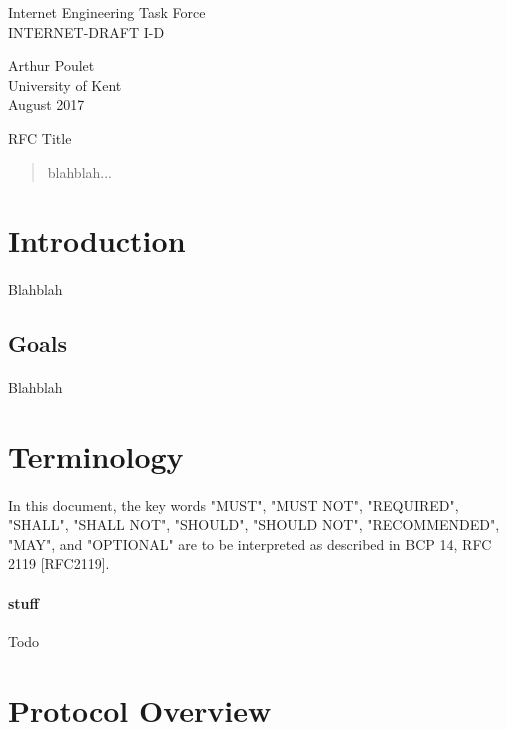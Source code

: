 \documentclass[10pt]{article}
\newcommand{\rfcId}{I-D}
\newcommand{\rfcTitle}{RFC Title}
\newcommand{\rfcAuthor}{Arthur Poulet}
\newcommand{\rfcDate}{August 2017}
\newcommand{\rfcInstitution}{University of Kent}
\newcommand{\rfcSection}[2]{
	\rfcNewPage
	\vspace*{0.1in}
	\section{#1}
	{\narrower #2 \par}
	\vfill
}
\newcommand{\rfcSubsection}[2]{
\vspace*{0.1in}
\subsection{#1}
\vspace*{0.15in}
{\narrower #2 \par}
}
\newcommand{\rfcNewPage}{\hspace{6in}\newpage}
\begin{document}
\begin{multicols}{2}
	\begin{flushleft}
		Internet Engineering Task Force \\
		INTERNET-DRAFT \rfcId
	\end{flushleft}
\columnbreak
	\begin{flushright}
		\rfcAuthor \\
		\rfcInstitution \\
		\rfcDate
	\end{flushright}
\end{multicols}

\vspace{1in} { \center \rfcTitle \\ } \vspace{1in}

\begin{abstract}
  blahblah...
\end{abstract}

\rfcNewPage
\tableofcontents

\justify
\rfcSection{Introduction}{
	\paragraph{}
	Blahblah

	\rfcSubsection{Goals}{
		\paragraph{}
		Blahblah
	}
}
\rfcSection{Terminology}{
	\paragraph{}
	In this document, the key words "MUST", "MUST NOT", "REQUIRED",
	"SHALL", "SHALL NOT", "SHOULD", "SHOULD NOT", "RECOMMENDED", "MAY",
	and "OPTIONAL" are to be interpreted as described in BCP 14, RFC 2119   [RFC2119].
	
	\paragraph{stuff} Todo
}

\rfcSection{Protocol Overview}{
	\paragraph{}
}
\end{document}
